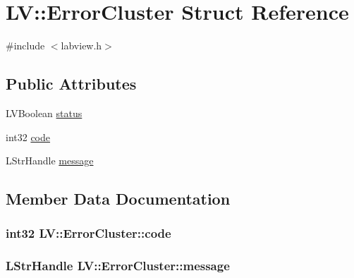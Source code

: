 \hypertarget{struct_l_v_1_1_error_cluster}{}\section{LV\+:\+:Error\+Cluster Struct Reference}
\label{struct_l_v_1_1_error_cluster}


{\ttfamily \#include $<$labview.\+h$>$}

\subsection*{Public Attributes}
\begin{DoxyCompactItemize}
\item 
L\+V\+Boolean \hyperlink{struct_l_v_1_1_error_cluster_a5afa01e7222b9c669a1c2bbe03ebe6ee}{status}
\item 
int32 \hyperlink{struct_l_v_1_1_error_cluster_aa42603b9871dc1a64e7f3b9537644f34}{code}
\item 
L\+Str\+Handle \hyperlink{struct_l_v_1_1_error_cluster_a1d065a9f167ecabac0bdd2d85b7636e3}{message}
\end{DoxyCompactItemize}


\subsection{Member Data Documentation}
\subsubsection[{\texorpdfstring{code}{code}}]{\setlength{\rightskip}{0pt plus 5cm}int32 L\+V\+::\+Error\+Cluster\+::code}\hypertarget{struct_l_v_1_1_error_cluster_aa42603b9871dc1a64e7f3b9537644f34}{}\label{struct_l_v_1_1_error_cluster_aa42603b9871dc1a64e7f3b9537644f34}
\subsubsection[{\texorpdfstring{message}{message}}]{\setlength{\rightskip}{0pt plus 5cm}L\+Str\+Handle L\+V\+::\+Error\+Cluster\+::message}\hypertarget{struct_l_v_1_1_error_cluster_a1d065a9f167ecabac0bdd2d85b7636e3}{}\label{struct_l_v_1_1_error_cluster_a1d065a9f167ecabac0bdd2d85b7636e3}
